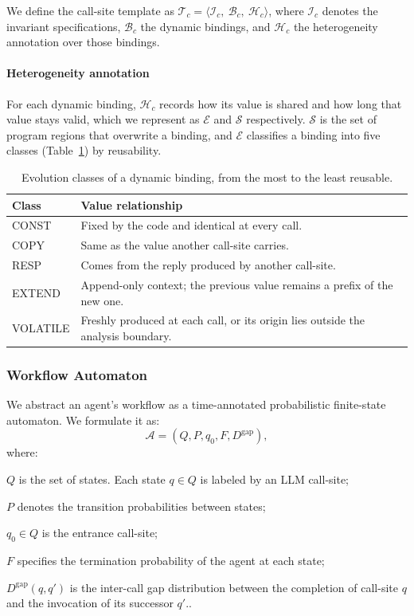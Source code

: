 We define the call-site template as $\mathcal{T}_c=\langle \mathcal{I}_c,\ \mathcal{B}_c,\ \mathcal{H}_c \rangle$, where $\mathcal{I}_c$ denotes the invariant specifications, $\mathcal{B}_c$ the dynamic bindings, and $\mathcal{H}_c$ the heterogeneity annotation over those bindings.

\paragraph{Heterogeneity annotation}
For each dynamic binding, $\mathcal{H}_c$ records how its value is shared and how long that value stays valid, which we represent as $\mathcal{E}$ and $\mathcal{S}$ respectively. $\mathcal{S}$ is the set of program regions that overwrite a binding, and $\mathcal{E}$ classifies a binding into five classes (Table~\ref{tab:evolution_classes}) by reusability.
\begin{table}[h]
    \centering
    \small
    \caption{Evolution classes of a dynamic binding, from the most to the least reusable.}
    \label{tab:evolution_classes}
    \setlength{\tabcolsep}{4pt}
    \begin{tabular}{@{}lp{}@{}}
        \toprule
        Class & Value relationship \\
        \midrule
        CONST    & Fixed by the code and identical at every call. \\
        COPY     & Same as the value another call-site carries. \\
        RESP     & Comes from the reply produced by another call-site. \\
        EXTEND   & Append-only context; the previous value remains a prefix of the new one. \\
        VOLATILE & Freshly produced at each call, or its origin lies outside the analysis boundary. \\
        \bottomrule
    \end{tabular}
\end{table}
\subsubsection{Workflow Automaton}
\label{sec:TPFM}
We abstract an agent's workflow as a time-annotated probabilistic finite-state automaton. We formulate it as: 
\[
\mathcal{A} = (Q, P, q_0, F, D^{\mathrm{gap}}),
\]
where:
\begin{enumerate*}[label=(\roman*)]
    \item $Q$ is the set of states. Each state $q\in Q$ is labeled by an LLM call-site;
    \item $P$ denotes the transition probabilities between states;
    \item $q_0 \in Q$ is the entrance call-site;
    \item $F$ specifies the termination probability of the agent at each state;
    \item $D^{\mathrm{gap}}(q,q')$ is the inter-call gap distribution between the completion of call-site $q$ and the invocation of its successor $q'$..
\end{enumerate*}

